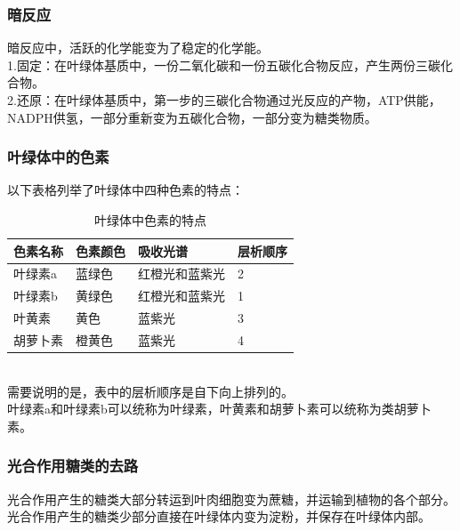 \documentclass[UTF8]{ctexart}
\begin{document}
\subsubsection{暗反应}
    暗反应中，活跃的化学能变为了稳定的化学能。\\[3mm]
    1.固定：在叶绿体基质中，一份二氧化碳和一份五碳化合物反应，产生两份三碳化合物。\\[3mm]
    2.还原：在叶绿体基质中，第一步的三碳化合物通过光反应的产物，ATP供能，NADPH供氢，一部分重新变为五碳化合物，一部分变为糖类物质。
    
\newpage

\subsubsection{叶绿体中的色素}
    以下表格列举了叶绿体中四种色素的特点：\vspace{8pt}
    \begin{table}[h]
        \begin{center}
            \begin{tabular}{l|l|l|l}
                \hline
                色素名称\qquad\qquad&色素颜色\qquad\qquad&吸收光谱\qquad\qquad\qquad&层析顺序\qquad\qquad\\ \hline
                叶绿素a&蓝绿色&红橙光和蓝紫光&2\\ \hline
                叶绿素b&黄绿色&红橙光和蓝紫光&1\\ \hline
                叶黄素&黄色&蓝紫光&3\\ \hline
                胡萝卜素&橙黄色&蓝紫光&4\\ \hline
            \end{tabular}
            \caption{叶绿体中色素的特点}
        \end{center}
    \end{table}\\
    需要说明的是，表中的层析顺序是自下向上排列的。\\[3mm]
    叶绿素a和叶绿素b可以统称为叶绿素，叶黄素和胡萝卜素可以统称为类胡萝卜素。

\subsubsection{光合作用糖类的去路}
    光合作用产生的糖类大部分转运到叶肉细胞变为蔗糖，并运输到植物的各个部分。\\[3mm]
    光合作用产生的糖类少部分直接在叶绿体内变为淀粉，并保存在叶绿体内部。
\end{document}
